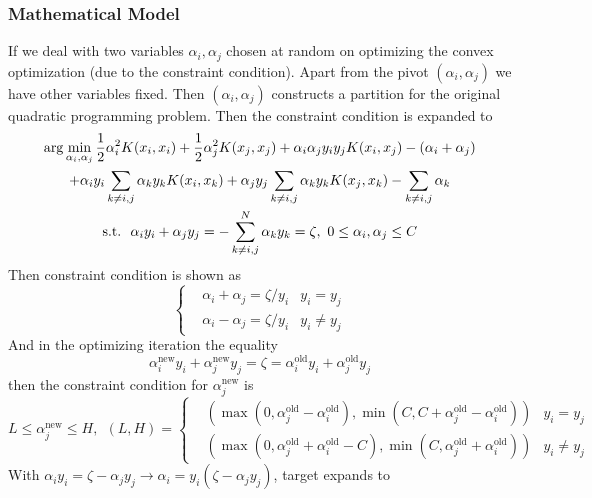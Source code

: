 \documentclass[12pt]{article}
\newcommand{\new}{\text{new}}
\newcommand{\old}{\text{old}}
\begin{document}
\subsubsection{Mathematical Model}
If we deal with two variables $\alpha_i, \alpha_j$ chosen at random on optimizing the convex optimization (due to the constraint condition). Apart from the pivot $(\alpha_i, \alpha_j)$ we have other variables fixed. Then $(\alpha_i, \alpha_j)$ constructs a partition for the original quadratic programming problem.
Then the constraint condition is expanded to
\begin{gather}
    \arg \min_{\alpha_i, \alpha_j} \frac{1}{2} \alpha_i^2 K(x_i, x_i) + \frac{1}{2}\alpha_j^2 K(x_j, x_j) + \alpha_i\alpha_j y_i y_j K(x_i, x_j) - (\alpha_i + \alpha_j) \notag \\ + \alpha_i y_i \sum_{k\neq i, j} \alpha_k y_k K(x_i, x_k) + \alpha_j y_j \sum_{k\neq i,j} \alpha_k y_k K(x_j, x_k) - \sum_{k\neq i, j} \alpha_k \\
    \text{s.t.}~~\alpha_iy_i + \alpha_jy_j = -\sum_{k \neq i,j}^N \alpha_k y_k =   \zeta,~0 \leq \alpha_i, \alpha_j \leq C
\end{gather}
Then constraint condition is shown as
\begin{equation}
    \left\{ \begin{aligned}
        &\alpha_i + \alpha_j = \zeta / y_i &y_i = y_j \\
        &\alpha_i - \alpha_j = \zeta / y_i &y_i \neq y_j
    \end{aligned} \right.
\end{equation}
And in the optimizing iteration the equality
\begin{equation}
    \alpha_i^{\new}y_i + \alpha_j^{\new}y_j = \zeta = \alpha_i^{\old}y_i + \alpha_j^{\old}y_j
\end{equation}
then the constraint condition for $\alpha_j^{\new}$ is
\begin{equation}
    L \leq \alpha_j^{\new} \leq H,~~(L, H) = \left\{ \begin{aligned}
        &\left( \max(0, \alpha_j^{\old} - \alpha_i^{\old}), \min(C, C+\alpha_j^{\old} - \alpha_i^{\old}) \right) &y_i = y_j \\
        &\left( \max(0, \alpha_j^{\old} + \alpha_i^{\old} - C), \min(C, \alpha_j^{\old} + \alpha_i^{\old})\right) &y_i \neq y_j
    \end{aligned} \right.
\end{equation}
With $\alpha_iy_i = \zeta - \alpha_jy_j \rightarrow \alpha_i = y_i(\zeta - \alpha_jy_j)$, target expands to
\end{document}
